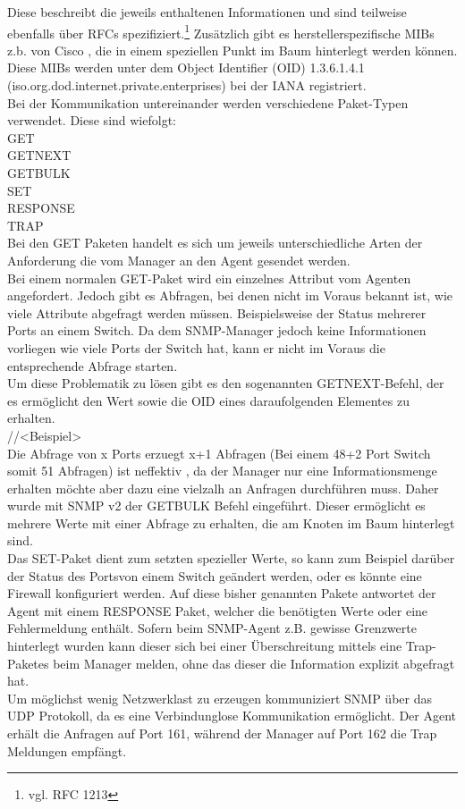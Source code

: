 Diese beschreibt die jeweils enthaltenen Informationen und sind teilweise ebenfalls über RFCs spezifiziert.\footnote{vgl. RFC 1213} Zusätzlich gibt es herstellerspezifische MIBs z.b. von Cisco , die in einem speziellen Punkt im Baum hinterlegt werden können. Diese MIBs werden unter dem  Object Identifier (OID) 1.3.6.1.4.1 (iso.org.dod.internet.private.enterprises) bei der IANA registriert.\\
Bei der Kommunikation untereinander werden verschiedene Paket-Typen verwendet.
Diese sind wiefolgt:\\
GET\\
GETNEXT\\
GETBULK\\
SET\\
RESPONSE\\
TRAP\\


Bei den GET Paketen handelt es sich um jeweils unterschiedliche Arten der Anforderung die vom Manager an den Agent gesendet werden.\\
Bei einem normalen GET-Paket wird ein einzelnes Attribut vom Agenten angefordert. Jedoch gibt es Abfragen, bei denen nicht im Voraus bekannt ist, wie viele Attribute abgefragt werden müssen. Beispielsweise der Status mehrerer Ports an einem Switch. Da dem SNMP-Manager jedoch keine Informationen vorliegen wie viele Ports der Switch hat, kann er nicht im Voraus die entsprechende Abfrage starten.\\
Um diese Problematik zu lösen gibt es den sogenannten GETNEXT-Befehl, der es ermöglicht den Wert sowie die OID eines daraufolgenden Elementes zu erhalten.\\

//<Beispiel>\\

Die Abfrage von x Ports erzuegt x+1 Abfragen (Bei einem 48+2 Port Switch somit 51 Abfragen) ist neffektiv , da der Manager nur eine Informationsmenge erhalten möchte aber dazu eine vielzalh an Anfragen durchführen muss. Daher wurde mit SNMP v2 der GETBULK Befehl eingeführt. Dieser ermöglicht es mehrere Werte mit einer Abfrage zu erhalten, die am Knoten im Baum hinterlegt sind.\\
Das SET-Paket dient zum setzten spezieller Werte, so kann zum Beispiel darüber der Status des Portsvon einem Switch  geändert werden, oder es könnte eine Firewall konfiguriert werden.
Auf diese bisher genannten Pakete antwortet der Agent mit einem RESPONSE Paket, welcher die benötigten Werte oder eine Fehlermeldung enthält.
Sofern beim SNMP-Agent z.B. gewisse Grenzwerte hinterlegt wurden kann dieser sich bei einer Überschreitung mittels eine Trap-Paketes beim Manager melden, ohne das dieser die Information explizit abgefragt hat.\\
Um möglichst wenig Netzwerklast zu erzeugen kommuniziert SNMP über das UDP Protokoll, da es eine Verbindunglose Kommunikation ermöglicht. Der Agent erhält die Anfragen auf Port 161, während der Manager auf Port 162 die Trap Meldungen empfängt.\\

